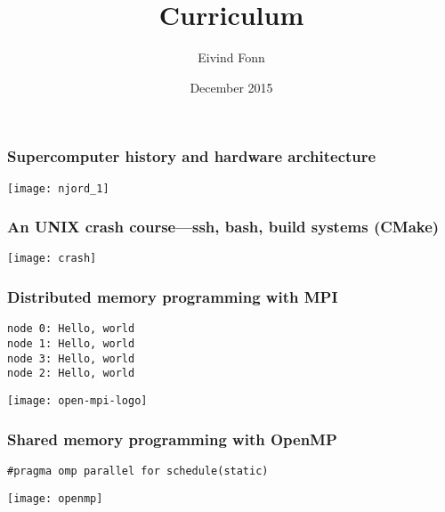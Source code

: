 

\title{Curriculum}
\author{Eivind Fonn}
\date{December 2015}
\maketitle

\begin{frame}
  \frametitle{Supercomputer history and hardware architecture}
  \begin{center}
    \texttt{[image: njord\_1]}
  \end{center}
\end{frame}

\begin{frame}
  \frametitle{An UNIX crash course---ssh, bash, build systems (CMake)}
  \begin{center}
    \texttt{[image: crash]}
  \end{center}
\end{frame}

\begin{frame}[fragile]
  \frametitle{Distributed memory programming with MPI}
  \begin{center}
    \texttt{node 0: Hello, world} \\
    \texttt{node 1: Hello, world} \\
    \texttt{node 3: Hello, world} \\
    \texttt{node 2: Hello, world}
  \end{center}
  \begin{center}
    \texttt{[image: open-mpi-logo]}
  \end{center}
\end{frame}

\begin{frame}
  \frametitle{Shared memory programming with OpenMP}
  \begin{center}
    \texttt{\#pragma omp parallel for schedule(static)}
  \end{center}
  \begin{center}
    \texttt{[image: openmp]}
  \end{center}
\end{frame}


